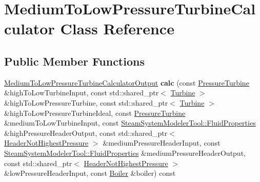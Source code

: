 \hypertarget{class_medium_to_low_pressure_turbine_calculator}{}\section{Medium\+To\+Low\+Pressure\+Turbine\+Calculator Class Reference}
\label{class_medium_to_low_pressure_turbine_calculator}
\subsection*{Public Member Functions}
\begin{DoxyCompactItemize}
\item 
\mbox{\label{class_medium_to_low_pressure_turbine_calculator_aca7259610c8db3bce4d434a9faa0f7f9}} 
\hyperlink{class_medium_to_low_pressure_turbine_calculator_output}{Medium\+To\+Low\+Pressure\+Turbine\+Calculator\+Output} {\bfseries calc} (const \hyperlink{class_pressure_turbine}{Pressure\+Turbine} \&high\+To\+Low\+Turbine\+Input, const std\+::shared\+\_\+ptr$<$ \hyperlink{class_turbine}{Turbine} $>$ \&high\+To\+Low\+Pressure\+Turbine, const std\+::shared\+\_\+ptr$<$ \hyperlink{class_turbine}{Turbine} $>$ \&high\+To\+Low\+Pressure\+Turbine\+Ideal, const \hyperlink{class_pressure_turbine}{Pressure\+Turbine} \&medium\+To\+Low\+Turbine\+Input, const \hyperlink{struct_steam_system_modeler_tool_1_1_fluid_properties}{Steam\+System\+Modeler\+Tool\+::\+Fluid\+Properties} \&high\+Pressure\+Header\+Output, const std\+::shared\+\_\+ptr$<$ \hyperlink{class_header_not_highest_pressure}{Header\+Not\+Highest\+Pressure} $>$ \&medium\+Pressure\+Header\+Input, const \hyperlink{struct_steam_system_modeler_tool_1_1_fluid_properties}{Steam\+System\+Modeler\+Tool\+::\+Fluid\+Properties} \&medium\+Pressure\+Header\+Output, const std\+::shared\+\_\+ptr$<$ \hyperlink{class_header_not_highest_pressure}{Header\+Not\+Highest\+Pressure} $>$ \&low\+Pressure\+Header\+Input, const \hyperlink{class_boiler}{Boiler} \&boiler) const
\item 
\mbox{\label{class_medium_to_low_pressure_turbine_calculator_aca7259610c8db3bce4d434a9faa0f7f9}} 

\end{DoxyCompactItemize}
